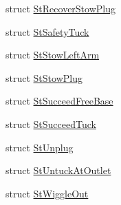 \begin{DoxyCompactItemize}
\item 
struct \hyperlink{structsm__pr2__plugs_1_1StRecoverStowPlug}{St\+Recover\+Stow\+Plug}
\item 
struct \hyperlink{structsm__pr2__plugs_1_1StSafetyTuck}{St\+Safety\+Tuck}
\item 
struct \hyperlink{structsm__pr2__plugs_1_1StStowLeftArm}{St\+Stow\+Left\+Arm}
\item 
struct \hyperlink{structsm__pr2__plugs_1_1StStowPlug}{St\+Stow\+Plug}
\item 
struct \hyperlink{structsm__pr2__plugs_1_1StSucceedFreeBase}{St\+Succeed\+Free\+Base}
\item 
struct \hyperlink{structsm__pr2__plugs_1_1StSucceedTuck}{St\+Succeed\+Tuck}
\item 
struct \hyperlink{structsm__pr2__plugs_1_1StUnplug}{St\+Unplug}
\item 
struct \hyperlink{structsm__pr2__plugs_1_1StUntuckAtOutlet}{St\+Untuck\+At\+Outlet}
\item 
struct \hyperlink{structsm__pr2__plugs_1_1StWiggleOut}{St\+Wiggle\+Out}
\end{DoxyCompactItemize}
